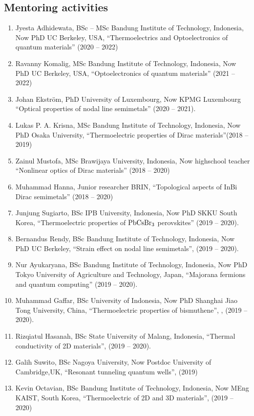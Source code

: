 \documentclass[a4paper,11pt]{article}
\begin{document}
\subsection*{Mentoring activities}
\begin{enumerate}
\item Jyesta Adhidewata, BSc -- MSc Bandung Institute of Technology, Indonesia, Now PhD UC Berkeley, USA, ``Thermoelectrics and Optoelectronics of quantum materials'' (2020 -- 2022)
\item Ravanny Komalig, MSc Bandung Institute of Technology, Indonesia, Now PhD UC Berkeley, USA, ``Optoelectronics of quantum materials'' (2021 -- 2022)
\item Johan Ekstr\"om, PhD  University of Luxembourg, Now KPMG Luxembourg ``Optical properties of nodal line semimetals'' (2020 -- 2021).
\item Lukas P. A. Krisna, MSc Bandung Institute of Technology, Indonesia, Now PhD Osaka University, ``Thermoelectric properties of Dirac materials''(2018 -- 2019)
\item Zainul Mustofa, MSc Brawijaya University, Indonesia, Now highschool teacher ``Nonlinear optics of Dirac materials'' (2018 -- 2020)
\item Muhammad Hanna, Junior researcher BRIN, ``Topological aspects of InBi Dirac semimetals''  (2018 -- 2020)
\item Junjung Sugiarto, BSc IPB University, Indonesia, Now PhD SKKU South Korea,  ``Thermoelectric properties of $\rm PbCsBr_3$ perovskites''  (2019 -- 2020).
\item Bernandus Rendy, BSc Bandung Institute of Technology, Indonesia, Now PhD UC Berkeley, ``Strain effect on nodal line semimetals'',  (2019 -- 2020).
\item Nur Ayukaryana, BSc Bandung Institute of Technology, Indonesia, Now PhD Tokyo University of Agriculture and Technology, Japan, ``Majorana fermions and quantum computing''  (2019 -- 2020).
  \item Muhammad Gaffar,  BSc University of Indonesia, Now PhD Shanghai Jiao Tong University, China, ``Thermoelectric properties of bismuthene'', , (2019 -- 2020).
   \item Rizqiatul Hasanah, BSc State University of Malang, Indonesia, ``Thermal conductivity of 2D materials'',  (2019 -- 2020).
   \item Galih Suwito, BSc Nagoya University, Now Postdoc University of Cambridge,UK, ``Resonant tunneling quantum wells'', (2019)
   \item Kevin Octavian,  BSc Bandung Institute of Technology, Indonesia, Now MEng KAIST, South Korea, ``Thermoelectric of 2D and 3D materials'',  (2019 -- 2020)
\end{enumerate}
\end{document}
